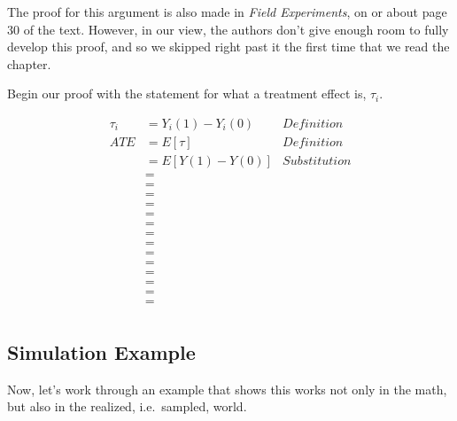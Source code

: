 \documentclass[
]{article}
\theoremstyle{definition}
\theoremstyle{definition}
\theoremstyle{definition}
\theoremstyle{definition}
\theoremstyle{remark}
\begin{document}
The proof for this argument is also made in \emph{Field Experiments}, on or about page 30 of the text. However, in our view, the authors don't give enough room to fully develop this proof, and so we skipped right past it the first time that we read the chapter.

Begin our proof with the statement for what a treatment effect is, \(\tau_{i}\).

\[
  \begin{aligned} 
    \tau_{i}    &= Y_{i}(1) - Y_{i}(0)    & Definition   \\ 
    ATE         &= E[\tau]                & Definition   \\
                &= E[Y(1) - Y(0)]         & Substitution \\
                &=                                       \\
                &=                                       \\
                &=                                       \\
                &=                                       \\
                &=                                       \\
                &=                                       \\
                &=                                       \\
                &=                                       \\
                &=                                       \\
                &=                                       \\
                &=                                       \\
                &=                                       \\
                &=                                       \\
                &=                                       \\
  \end{aligned}
\]

\subsection{Simulation Example}\label{simulation-example}

Now, let's work through an example that shows this works not only in the math, but also in the realized, i.e.~sampled, world.
\end{document}
